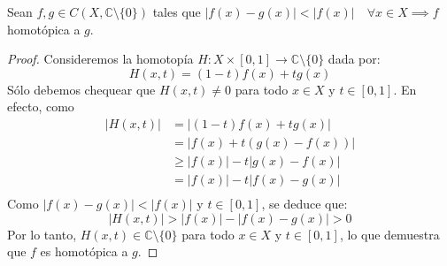 \documentclass{article}
\theoremstyle{plain}
\theoremstyle{definition}
\newcommand{\C}{\mathbb{C}}
\newenvironment{ejercicio}[1]{\begin{trivlist}
\item[\hskip \labelsep {\bfseries Ejercicio}\hskip \labelsep {\bfseries #1.}]}{\end{trivlist}}
\begin{document}
\begin{ejercicio}{15}
    Sean \(f, g \in C(X, \C \setminus \{ 0 \}) \) tales que \( |f(x) - g(x)| < |f(x)| \quad \forall x \in X \implies f \) homotópica a \( g \).
\end{ejercicio}
\begin{proof}
    Consideremos la homotopía \( H : X \times [0, 1] \to \C \setminus \{ 0 \} \) dada por:
    \[
        H(x, t) = (1-t)f(x) + t g(x)
    \]
    Sólo debemos chequear que \( H(x, t) \neq 0 \) para todo \( x \in X \) y \( t \in [0, 1] \).
    En efecto, como \begin{align*}
        |H(x, t)| & = |(1-t)f(x)+t g(x)|        \\
                  & = |f(x) + t(g(x) - f(x))|   \\
                  & \ge |f(x)| - t|g(x) - f(x)| \\
                  & = |f(x)| - t|f(x) - g(x)|   \\
    \end{align*}
    Como \( |f(x) - g(x)| < |f(x)| \) y \( t \in [0, 1] \), se deduce que:
    \[
        |H(x, t)| > |f(x)| - |f(x) - g(x)| > 0
    \]
    Por lo tanto, \( H(x, t) \in \C \setminus \{ 0 \} \) para todo \( x \in X \) y \( t \in [0, 1] \), lo que demuestra que \( f \) es homotópica a \( g \).
\end{proof}
\end{document}
